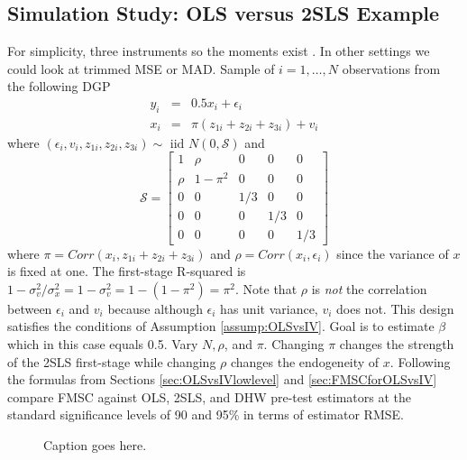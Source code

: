 \subsection{Simulation Study: OLS versus 2SLS Example}
For simplicity, three instruments so the moments exist \citep{Phillips1980}. 
In other settings we could look at trimmed MSE or MAD.
Sample of $i = 1, \hdots, N$ observations from the following DGP 
\begin{eqnarray}
	y_i &=& 0.5 x_i + \epsilon_i\\
	x_i &=& \pi(z_{1i} + z_{2i} + z_{3i}) + v_i
\end{eqnarray}
where $(\epsilon_i, v_i, z_{1i}, z_{2i}, z_{3i}) \sim \mbox{ iid } N(0, \mathcal{S})$ and
\begin{equation}
	\mathcal{S} = \left[ \begin{array}
		{ccccc} 
		1 & \rho & 0 & 0 & 0\\
		\rho & 1 - \pi^2 & 0 & 0 & 0\\
		0 & 0 & 1/3 & 0 & 0\\
		0 & 0 & 0 & 1/3 & 0 \\
		0 & 0 & 0 & 0 & 1/3
	\end{array}\right]
\end{equation}
where $\pi = Corr(x_i, z_{1i} + z_{2i} + z_{3i})$ and $\rho = Corr(x_i,\epsilon_i)$ since the variance of $x$ is fixed at one.
The first-stage R-squared is $1 - \sigma_v^2/\sigma_x^2 = 1 - \sigma_v^2 = 1 - (1 - \pi^2) = \pi^2$.
Note that $\rho$ is \emph{not} the correlation between $\epsilon_i$ and $v_i$ because although $\epsilon_i$ has unit variance, $v_i$ does not.
This design satisfies the conditions of Assumption \ref{assump:OLSvsIV}.
Goal is to estimate $\beta$ which in this case equals 0.5.
Vary $N, \rho$, and $\pi$.
Changing $\pi$ changes the strength of the 2SLS first-stage while changing $\rho$ changes the endogeneity of $x$.
Following the formulas from Sections \ref{sec:OLSvsIVlowlevel} and \ref{sec:FMSCforOLSvsIV} compare FMSC against OLS, 2SLS, and DHW pre-test estimators at the standard significance levels of 90 and 95\% in terms of estimator RMSE.

\begin{figure}
\centering
	
	\caption{Caption goes here.}
\end{figure}

